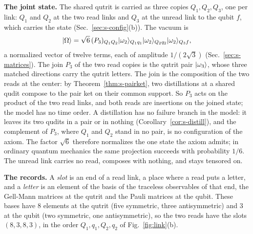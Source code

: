\textbf{The joint state.} The shared qutrit is carried as three copies $Q_{1},Q_{2},Q_{3}$, one per link: $Q_{1}$ and $Q_{2}$ at the two read links and $Q_{3}$ at the unread link to the qubit $f$, which carries the state (Sec.~\ref{sec:s-config}(b)). The vacuum is
\begin{equation}
|\Omega\rangle=\sqrt{6}\,(P_{3})_{Q_{1}Q_{2}}|\omega_{2}\rangle_{Q_{1}q_{1}}|\omega_{2}\rangle_{Q_{2}q_{2}}|\omega_{2}\rangle_{Q_{3}f},
\end{equation}
a normalized vector of twelve terms, each of amplitude $1/(2\sqrt{3})$ (Sec.~\ref{sec:s-matrices}). The join $P_{3}$ of the two read copies is the qutrit pair $|\omega_{3}\rangle$, whose three matched directions carry the qutrit letters. The join is the composition of the two reads at the center: by Theorem~\ref{thm:s-pairket}, two distillations at a shared qudit compose to the pair ket on their common support. So $P_{3}$ acts on the product of the two read links, and both reads are insertions on the joined state; the model has no time order. A distillation has no failure branch in the model: it leaves its two qudits in a pair or in nothing (Corollary~\ref{cor:s-distill}), and the complement of $P_{3}$, where $Q_{1}$ and $Q_{2}$ stand in no pair, is no configuration of the axiom. The factor $\sqrt{6}$ therefore normalizes the one state the axiom admits; in ordinary quantum mechanics the same projection succeeds with probability $1/6$. The unread link carries no read, composes with nothing, and stays tensored on.

\textbf{The records.} A \emph{slot} is an end of a read link, a place where a read puts a letter, and a \emph{letter} is an element of the basis of the traceless observables of that end, the Gell-Mann matrices at the qutrit and the Pauli matrices at the qubit. These bases have $8$ elements at the qutrit (five symmetric, three antisymmetric) and $3$ at the qubit (two symmetric, one antisymmetric), so the two reads have the slots $(8,3,8,3)$, in the order $Q_{1},q_{1},Q_{2},q_{2}$ of Fig.~\ref{fig:link}(b).

